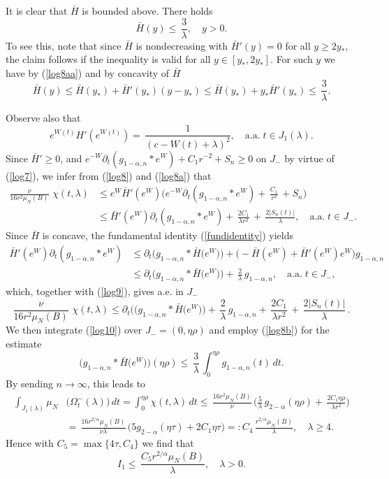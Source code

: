 \documentclass[10pt]{article}
\begin{document}
It is clear that $\bar{H}$ is bounded above. There holds
\begin{equation} \label{log8b}
\bar{H}(y)\le \,\frac{3}{\lambda},\quad y>0.
\end{equation}
To see this, note that since $\bar{H}$ is nondecreasing with
$\bar{H}'(y)=0$ for all $y\ge 2 y_*$, the claim follows if the
inequality is valid for all $y\in [y_*,2y_*]$. For such $y$ we
have by (\ref{log8aa}) and by concavity of $\bar{H}$
\[
\bar{H}(y)\le \bar{H}(y_*)+\bar{H}'(y_*)(y-y_*)\le
\bar{H}(y_*)+y_*\bar{H}'(y_*)\le \,\frac{3}{\lambda}.
\]

Observe also that
\[ e^{W(t)} H'(e^{W(t)})=\,\frac{1}{(c-W(t)+\lambda)^2
},\quad \mbox{a.a.}\;t\in J_1(\lambda).\] Since $\bar{H}'\ge 0$,
and $e^{-W}
\partial_t(g_{1-\alpha,n}\ast
e^W)+C_1 r^{-2}+S_n\ge 0$ on $J_-$ by virtue of (\ref{log7}), we
infer from (\ref{log8}) and (\ref{log8a}) that
\begin{align} \label{log9}
\frac{\nu}{16r^2 \mu_N(B)}\,\,\chi(t,\lambda) & \le
e^W\bar{H}'(e^{W})\Big(e^{-W}\partial_t(g_{1-\alpha,n}\ast
e^W)+\,\frac{C_1}{r^2}\,+S_n\Big)\nonumber\\
& \le \bar{H}'(e^{W})\partial_t(g_{1-\alpha,n}\ast
e^W)+\,\frac{2C_1}{\lambda r^2}\,+\,\frac{2|S_n(t)|}{\lambda},
\quad\mbox{a.a.}\; t\in J_-.
\end{align}
Since $\bar{H}$ is concave, the fundamental identity
(\ref{fundidentity}) yields
\begin{align*}
\bar{H}'(e^{W})\partial_t(g_{1-\alpha,n}\ast e^W) & \le
\partial_t\Big(g_{1-\alpha,n}\ast \bar{H}\big(e^W\big)\Big)
+ \Big(-\bar{H}(e^{W})+\bar{H}'(e^{W})
e^W\Big)g_{1-\alpha,n}\\
& \le \partial_t\Big(g_{1-\alpha,n}\ast
\bar{H}\big(e^W\big)\Big)+\,\frac{2}{\lambda}\,g_{1-\alpha,n},\quad
\mbox{a.a.}\; t\in J_-,
\end{align*}
which, together with (\ref{log9}), gives a.e. in $J_-$
\begin{equation} \label{log10}
\frac{\nu}{16r^2 \mu_N(B)}\,\,\chi(t,\lambda) \le
\partial_t\Big((g_{1-\alpha,n}\ast \bar{H}\big(e^W\big)\Big)
+\,\frac{2}{\lambda}\,g_{1-\alpha,n}+ \,\frac{2C_1}{\lambda
r^2}\,+\,\frac{2|S_n(t)|}{\lambda}\,.
\end{equation}
We then integrate (\ref{log10}) over $J_-=(0,\eta \rho)$ and
employ (\ref{log8b}) for the estimate
\[ \Big(g_{1-\alpha,n}\ast
\bar{H}\big(e^W\big)\Big)(\eta\rho)\le
\,\frac{3}{\lambda}\,\int_0^{\eta\rho}g_{1-\alpha,n}(t)\,dt.
\]
By sending $n\to \infty$, this leads to
\begin{align*}
\int_{J_1(\lambda)}\mu_N  & \big(\Omega^-_t(\lambda)\big) \,dt
  = \int_0^{\eta\rho} \chi(t,\lambda)\,dt
 \le\,\frac{16r^2\mu_N(B)}{\nu}\,\Big(\frac{5}{\lambda}\,g_{2-\alpha}(\eta\rho)+
 \,\frac{2C_1\eta\rho}{\lambda
r^2}\Big)\\
& =\,\frac{16r^{2/\alpha}\mu_N(B)}{\nu\lambda}\,
\big(5g_{2-\alpha}(\eta\tau)+
2C_1\eta\tau\big)=:C_4\,\frac{r^{2/\alpha}\mu_N(B)}{\lambda},\quad\lambda\ge
4.
\end{align*}
Hence with $C_5=\max\{4\tau,C_4\}$ we find that
\begin{equation} \label{I1est}
I_1\le \,\frac{C_5 r^{2/\alpha}\mu_N(B)}{\lambda},\quad\lambda>0.
\end{equation}
\end{document}
